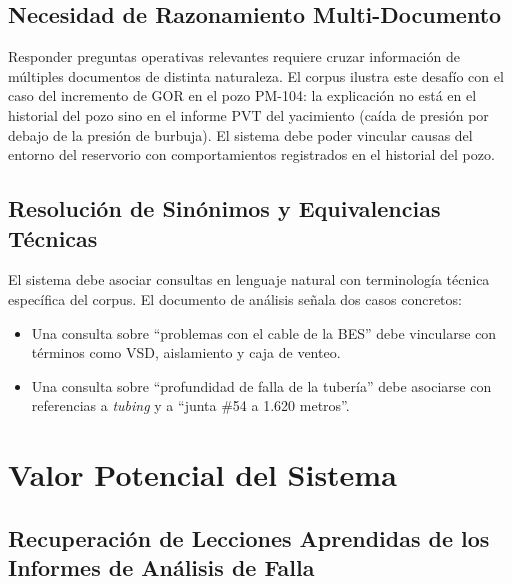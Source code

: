 \documentclass[12pt, a4paper]{article}
\begin{document}
\subsection{Necesidad de Razonamiento Multi-Documento}

Responder preguntas operativas relevantes requiere cruzar informaci\'{o}n de m\'{u}ltiples
documentos de distinta naturaleza. El corpus ilustra este desaf\'{i}o con el caso del
incremento de GOR en el pozo PM-104: la explicaci\'{o}n no est\'{a} en el historial del pozo
sino en el informe PVT del yacimiento (ca\'{i}da de presi\'{o}n por debajo de la presi\'{o}n
de burbuja). El sistema debe poder vincular causas del entorno del reservorio con
comportamientos registrados en el historial del pozo.

\subsection{Resoluci\'{o}n de Sin\'{o}nimos y Equivalencias T\'{e}cnicas}

El sistema debe asociar consultas en lenguaje natural con terminolog\'{i}a t\'{e}cnica
espec\'{i}fica del corpus. El documento de an\'{a}lisis se\~{n}ala dos casos concretos:

\begin{itemize}
  \item Una consulta sobre ``problemas con el cable de la BES'' debe vincularse con
        t\'{e}rminos como VSD, aislamiento y caja de venteo.
  \item Una consulta sobre ``profundidad de falla de la tuber\'{i}a'' debe asociarse con
        referencias a \textit{tubing} y a ``junta \#54 a 1.620 metros''.
\end{itemize}

\section{Valor Potencial del Sistema}

\subsection{Recuperaci\'{o}n de Lecciones Aprendidas de los Informes de An\'{a}lisis de Falla}
\end{document}
